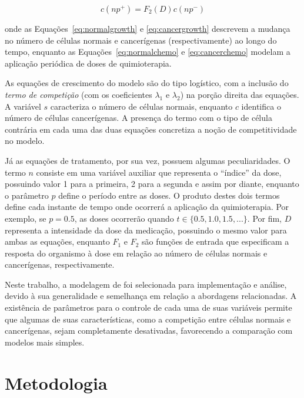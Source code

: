 \documentclass[12pt]{article}
\begin{document}
\begin{equation} \label{eq:cancerchemo}
  c(np^{+}) = F_{2}(D) c(np^{-})
\end{equation}

\noindent onde as Equações~\ref{eq:normalgrowth} e \ref{eq:cancergrowth} descrevem a mudança no número de células normais e cancerígenas (respectivamente) ao longo do tempo, enquanto as Equações~\ref{eq:normalchemo} e \ref{eq:cancerchemo} modelam a aplicação periódica de doses de quimioterapia.

As equações de crescimento do modelo são do tipo logístico, com a inclusão do \emph{termo de competição} (com os coeficientes $\lambda_1$ e $\lambda_2$) na porção direita das equações. A variável $s$ caracteriza o número de células normais, enquanto $c$ identifica o número de células cancerígenas. A presença do termo com o tipo de célula contrária em cada uma das duas equações concretiza a noção de competitividade no modelo.

Já as equações de tratamento, por sua vez, possuem algumas peculiaridades. O termo $n$ consiste em uma variável auxiliar que representa o ``índice'' da dose, possuindo valor 1 para a primeira, 2 para a segunda e assim por diante, enquanto o parâmetro $p$ define o período entre as doses. O produto destes dois termos define cada instante de tempo onde ocorrerá a aplicação da quimioterapia. Por exemplo, se $p = 0.5$, as doses ocorrerão quando $t \in \{0.5, 1.0, 1.5, ...\}$. Por fim, $D$ representa a intensidade da dose da medicação, possuindo o mesmo valor para ambas as equações, enquanto $F_1$ e $F_2$ são funções de entrada que especificam a resposta do organismo à dose em relação ao número de células normais e cancerígenas, respectivamente.


Neste trabalho, a modelagem de \cite{Panetta1996} foi selecionada para implementação e análise, devido à sua generalidade e semelhança em relação a abordagens relacionadas. A existência de parâmetros para o controle de cada uma de suas variáveis permite que algumas de suas características, como a competição entre células normais e cancerígenas, sejam completamente desativadas, favorecendo a comparação com modelos mais simples.

\section{Metodologia} \label{sec:methodology} %
\end{document}
